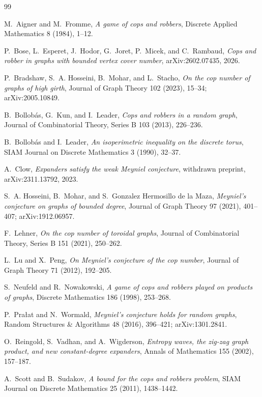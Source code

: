 \documentclass[11pt]{amsart}
\theoremstyle{definition}
\begin{document}
\begin{thebibliography}{99}

M.~Aigner and M.~Fromme,
\emph{A game of cops and robbers},
Discrete Applied Mathematics 8 (1984), 1--12.

P.~Bose, L.~Esperet, J.~Hodor, G.~Joret, P.~Micek, and C.~Rambaud,
\emph{Cops and robber in graphs with bounded vertex cover number},
arXiv:2602.07435, 2026.

P.~Bradshaw, S.~A. Hosseini, B.~Mohar, and L.~Stacho,
\emph{On the cop number of graphs of high girth},
Journal of Graph Theory 102 (2023), 15--34; arXiv:2005.10849.

B.~Bollob\'as, G.~Kun, and I.~Leader,
\emph{Cops and robbers in a random graph},
Journal of Combinatorial Theory, Series B 103 (2013), 226--236.

B.~Bollob\'as and I.~Leader,
\emph{An isoperimetric inequality on the discrete torus},
SIAM Journal on Discrete Mathematics 3 (1990), 32--37.

A.~Clow,
\emph{Expanders satisfy the weak Meyniel conjecture},
withdrawn preprint, arXiv:2311.13792, 2023.

S.~A. Hosseini, B.~Mohar, and S.~Gonzalez Hermosillo de la Maza,
\emph{Meyniel's conjecture on graphs of bounded degree},
Journal of Graph Theory 97 (2021), 401--407; arXiv:1912.06957.

F.~Lehner,
\emph{On the cop number of toroidal graphs},
Journal of Combinatorial Theory, Series B 151 (2021), 250--262.

L.~Lu and X.~Peng,
\emph{On Meyniel's conjecture of the cop number},
Journal of Graph Theory 71 (2012), 192--205.

S.~Neufeld and R.~Nowakowski,
\emph{A game of cops and robbers played on products of graphs},
Discrete Mathematics 186 (1998), 253--268.

P.~Pra{\l}at and N.~Wormald,
\emph{Meyniel's conjecture holds for random graphs},
Random Structures \& Algorithms 48 (2016), 396--421; arXiv:1301.2841.

O.~Reingold, S.~Vadhan, and A.~Wigderson,
\emph{Entropy waves, the zig-zag graph product, and new constant-degree
expanders},
Annals of Mathematics 155 (2002), 157--187.

A.~Scott and B.~Sudakov,
\emph{A bound for the cops and robbers problem},
SIAM Journal on Discrete Mathematics 25 (2011), 1438--1442.

\end{thebibliography}
\end{document}
